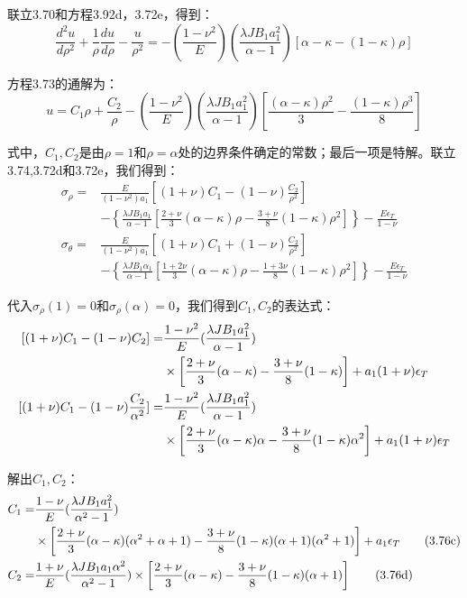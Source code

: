 联立3.70和方程3.92d，3.72e，得到：
\begin{equation}
\frac{d^2u}{d\rho^2}+\frac{1}{\rho}\frac{du}{d\rho}-\frac{u}{\rho^2}=-(\frac{1-\nu^2}{E})(\frac{\lambda JB_1a_1^2}{\alpha-1})[\alpha-\kappa-(1-\kappa)\rho] %
\end{equation}

方程3.73的通解为：
\begin{equation}
u=C_1\rho+\frac{C_2}{\rho}-(\frac{1-\nu^2}{E})(\frac{\lambda JB_1a_1^2}{\alpha-1})[\frac{(\alpha-\kappa)\rho^2}{3}-\frac{(1-\kappa)\rho^3}{8}]%
\end{equation}

式中，$C_1,C_2$是由$\rho=1$和$\rho=\alpha$处的边界条件确定的常数；最后一项是特解。联立3.74,3.72d和3.72e，我们得到：
\begin{subequations}
	\begin{align}
\sigma_\rho=&\frac{E}{(1-\nu^2)a_1}\left[(1+\nu)C_1-(1-\nu)\frac{C_2}{\rho^2}\right] \\ \nonumber
&-\left\{\frac{\lambda JB_1a_1}{\alpha-1}[\frac{2+\nu}{3}(\alpha-\kappa)\rho-\frac{3+\nu}{8}(1-\kappa)\rho^2]\right\}-\frac{E\epsilon_T}{1-\nu}\\
\sigma_\theta=&\frac{E}{(1-\nu^2)a_1}\left[(1+\nu)C_1+(1-\nu)\frac{C_2}{\rho^2}\right]\\ \nonumber
&-\left\{\frac{\lambda JB_1\alpha_1}{\alpha-1}[\frac{1+2\nu}{3}(\alpha-\kappa)\rho-\frac{1+3\nu}{8}(1-\kappa)\rho^2]\right\}-\frac{E\epsilon_T}{1-\nu}
	\end{align}
\end{subequations}

代入$\sigma_{\rho}(1)=0$和$\sigma_{\rho}(\alpha)=0$，我们得到$C_1,C_2$的表达式：
\begin{subequations}
	\begin{align}
{[(1+\nu)C_1-(1-\nu)C_2]}=&\frac{1-\nu^2}{E}(\frac{\lambda JB_1a_1^2}{\alpha-1})\notag\\
&\times\left[\frac{2+\nu}{3}(\alpha-\kappa)-\frac{3+\nu}{8}(1-\kappa)\right]+a_1(1+\nu)\epsilon_T\\
{[(1+\nu)C_1-(1-\nu)\frac{C_2}{\alpha^2}]}=&\frac{1-\nu^2}{E}(\frac{\lambda JB_1a_1^2}{\alpha-1}) \notag\\ 
&\times\left[\frac{2+\nu}{3}(\alpha-\kappa)\alpha-\frac{3+\nu}{8}(1-\kappa)\alpha^2\right] +a_1(1+\nu)\epsilon_T
	\end{align}
\end{subequations}

解出$C_1,C_2$：
\begin{align*}
C_1=&\frac{1-\nu}{E}(\frac{\lambda JB_1a_1^2}{\alpha^2-1})\notag\\
&\times\left[\frac{2+\nu}{3}(\alpha-\kappa)(\alpha^2+\alpha+1)
-\frac{3+\nu}{8}(1-\kappa)(\alpha+1)(\alpha^2+1)\right]
+a_1\epsilon_T\tag{3.76c}\\
C_2=&\frac{1+\nu}{E}(\frac{\lambda JB_1a_1\alpha^2}{\alpha^2-1})\times \left[\frac{2+\nu}{3}(\alpha-\kappa)-\frac{3+\nu}{8}(1-\kappa)(\alpha+1)\right]\tag{3.76d}
\end{align*}

